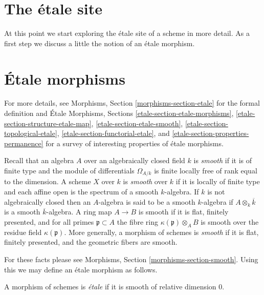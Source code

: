 \section{The \'etale site}
\label{section-etale-site}

\noindent
At this point we start exploring the \'etale site of a scheme in
more detail. As a first step we discuss a little the notion of an
\'etale morphism.





\section{\'Etale morphisms}
\label{section-etale-morphism}

\noindent
For more details, see
Morphisms, Section \ref{morphisms-section-etale}
for the formal definition and
\'Etale Morphisms, Sections
\ref{etale-section-etale-morphisms},
\ref{etale-section-structure-etale-map},
\ref{etale-section-etale-smooth},
\ref{etale-section-topological-etale},
\ref{etale-section-functorial-etale}, and
\ref{etale-section-properties-permanence}
for a survey of interesting properties of \'etale morphisms.

\medskip\noindent
Recall that an algebra $A$ over an algebraically closed field $k$ is
{\it smooth} if it is of finite type and the module of differentials
$\Omega_{A/k}$ is finite locally free of rank equal to the dimension.
A scheme $X$ over $k$ is {\it smooth} over $k$ if it is locally of finite
type and each affine open is the spectrum of a smooth $k$-algebra.
If $k$ is not algebraically closed then an $A$-algebra is said to be
a smooth $k$-algebra if $A \otimes_k \overline{k}$ is a smooth
$\overline{k}$-algebra. A ring map $A \to B$ is smooth if it is
flat, finitely presented, and for all primes $\mathfrak p \subset A$
the fibre ring $\kappa(\mathfrak p) \otimes_A B$ is smooth over the residue
field $\kappa(\mathfrak p)$. More generally, a morphism of schemes is
{\it smooth} if it is flat, finitely presented, and the geometric fibers
are smooth.

\medskip\noindent
For these facts please see
Morphisms, Section \ref{morphisms-section-smooth}.
Using this we may define an \'etale morphism as follows.

\begin{definition}
\label{definition-etale-morphism}
A morphism of schemes is {\it \'etale} if it is smooth of relative dimension 0.
\end{definition}

